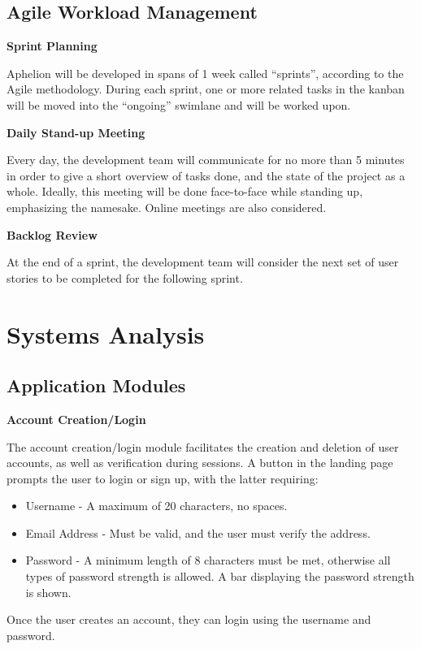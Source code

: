 \subsection{Agile Workload Management}

\textbf{Sprint Planning}

Aphelion will be developed in spans of 1 week called “sprints”, according to the Agile methodology. During each sprint, one or more related tasks in the kanban will be moved into the “ongoing” swimlane and will be worked upon.

\textbf{Daily Stand-up Meeting}

Every day, the development team will communicate for no more than 5 minutes in order to give a short overview of tasks done, and the state of the project as a whole. Ideally, this meeting will be done face-to-face while standing up, emphasizing the namesake. Online meetings are also considered.

\textbf{Backlog Review}

At the end of a sprint, the development team will consider the next set of user stories to be completed for the following sprint.

\section{Systems Analysis}

\subsection{Application Modules}

\textbf{Account Creation/Login}

The account creation/login module facilitates the creation and deletion of user accounts, as well as verification during sessions. A button in the landing page prompts the user to login or sign up, with the latter requiring:

\begin{itemize}
\item Username - A maximum of 20 characters, no spaces.
\item Email Address - Must be valid, and the user must verify the address.
\item Password - A minimum length of 8 characters must be met, otherwise all types of password strength is allowed. A bar displaying the password strength is shown.
\end{itemize}

Once the user creates an account, they can login using the username and password.

